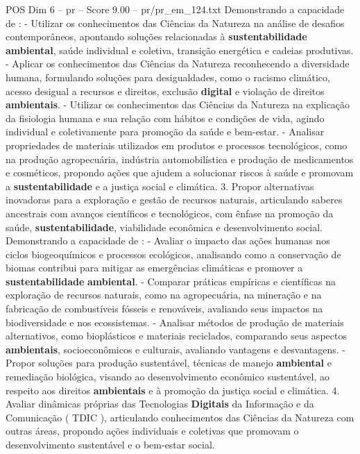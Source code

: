 \begin{textsample}{POS Dim 6 – pr – Score 9.00 – pr/pr\_em\_124.txt}
Demonstrando a capacidade de : - Utilizar os conhecimentos das Ciências da Natureza na análise de desafios contemporâneos, apontando soluções relacionadas à \textbf{sustentabilidade} \textbf{ambiental}, saúde individual e coletiva, transição energética e cadeias produtivas. - Aplicar os conhecimentos das Ciências da Natureza reconhecendo a diversidade humana, formulando soluções para desigualdades, como o racismo climático, acesso desigual a recursos e direitos, exclusão \textbf{digital} e violação de direitos \textbf{ambientais}. - Utilizar os conhecimentos das Ciências da Natureza na explicação da fisiologia humana e sua relação com hábitos e condições de vida, agindo individual e coletivamente para promoção da saúde e bem-estar. - Analisar propriedades de materiais utilizados em produtos e processos tecnológicos, como na produção agropecuária, indústria automobilística e produção de medicamentos e cosméticos, propondo ações que ajudem a solucionar riscos à saúde e promovam a \textbf{sustentabilidade} e a justiça social e climática. 3.
Propor alternativas inovadoras para a exploração e gestão de recursos naturais, articulando saberes ancestrais com avanços científicos e tecnológicos, com ênfase na promoção da saúde, \textbf{sustentabilidade}, viabilidade econômica e desenvolvimento social.
Demonstrando a capacidade de : - Avaliar o impacto das ações humanas nos ciclos biogeoquímicos e processos ecológicos, analisando como a conservação de biomas contribui para mitigar as emergências climáticas e promover a \textbf{sustentabilidade} \textbf{ambiental}. - Comparar práticas empíricas e científicas na exploração de recursos naturais, como na agropecuária, na mineração e na fabricação de combustíveis fósseis e renováveis, avaliando seus impactos na biodiversidade e nos ecossistemas. - Analisar métodos de produção de materiais alternativos, como bioplásticos e materiais reciclados, comparando seus aspectos \textbf{ambientais}, socioeconômicos e culturais, avaliando vantagens e desvantagens. - Propor soluções para produção sustentável, técnicas de manejo \textbf{ambiental} e remediação biológica, visando ao desenvolvimento econômico sustentável, ao respeito aos direitos \textbf{ambientais} e à promoção da justiça social e climática. 4.
Avaliar dinâmicas próprias das Tecnologias \textbf{Digitais} da Informação e da Comunicação ( TDIC ), articulando conhecimentos das Ciências da Natureza com outras áreas, propondo ações individuais e coletivas que promovam o desenvolvimento sustentável e o bem-estar social.

\end{textsample}
